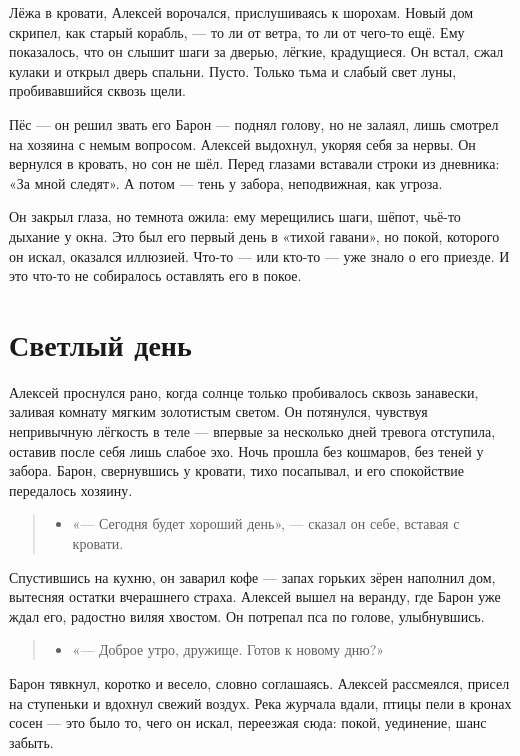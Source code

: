 \documentclass[12pt,a4paper]{book}
\newenvironment{dialogue}{\begin{quote}\itshape\begin{itemize}\item[]}{\end{itemize}\end{quote}}
\begin{document}
Лёжа в кровати, Алексей ворочался, прислушиваясь к шорохам. Новый дом скрипел, как старый корабль, — то ли от ветра, то ли от чего-то ещё. Ему показалось, что он слышит шаги за дверью, лёгкие, крадущиеся. Он встал, сжал кулаки и открыл дверь спальни. Пусто. Только тьма и слабый свет луны, пробивавшийся сквозь щели.

Пёс — он решил звать его Барон — поднял голову, но не залаял, лишь смотрел на хозяина с немым вопросом. Алексей выдохнул, укоряя себя за нервы. Он вернулся в кровать, но сон не шёл. Перед глазами вставали строки из дневника: «За мной следят». А потом — тень у забора, неподвижная, как угроза.

Он закрыл глаза, но темнота ожила: ему мерещились шаги, шёпот, чьё-то дыхание у окна. Это был его первый день в «тихой гавани», но покой, которого он искал, оказался иллюзией. Что-то — или кто-то — уже знало о его приезде. И это что-то не собиралось оставлять его в покое.

\chapter{Светлый день}

Алексей проснулся рано, когда солнце только пробивалось сквозь занавески, заливая комнату мягким золотистым светом. Он потянулся, чувствуя непривычную лёгкость в теле — впервые за несколько дней тревога отступила, оставив после себя лишь слабое эхо. Ночь прошла без кошмаров, без теней у забора. Барон, свернувшись у кровати, тихо посапывал, и его спокойствие передалось хозяину.

\begin{dialogue}
«— Сегодня будет хороший день», — сказал он себе, вставая с кровати.
\end{dialogue}

Спустившись на кухню, он заварил кофе — запах горьких зёрен наполнил дом, вытесняя остатки вчерашнего страха. Алексей вышел на веранду, где Барон уже ждал его, радостно виляя хвостом. Он потрепал пса по голове, улыбнувшись.

\begin{dialogue}
«— Доброе утро, дружище. Готов к новому дню?»
\end{dialogue}

Барон тявкнул, коротко и весело, словно соглашаясь. Алексей рассмеялся, присел на ступеньки и вдохнул свежий воздух. Река журчала вдали, птицы пели в кронах сосен — это было то, чего он искал, переезжая сюда: покой, уединение, шанс забыть.
\end{document}
